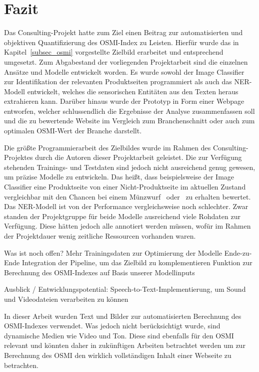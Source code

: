 \section{Fazit}

Das Consulting-Projekt hatte zum Ziel einen Beitrag zur automatisierten und objektiven Quantifizierung des
\ac{OSMI}-Index zu Leisten.
Hierfür wurde das in Kapitel~\ref{subsec_osmi} vorgestellte Zielbild erarbeitet und entsprechend umgesetzt.
Zum Abgabestand der vorliegenden Projektarbeit sind die einzelnen Ansätze und Modelle entwickelt worden.
Es wurde sowohl der Image Classifier zur Identifikation der relevanten Produktseiten programmiert als auch das \ac{NER}-Modell
entwickelt, welches die sensorischen Entitäten aus den Texten heraus extrahieren kann.
Darüber hinaus wurde der Prototyp in Form einer Webpage entworfen, welcher schlussendlich die Ergebnisse der Analyse
zusammenfassen soll und die zu bewertende Website im Vergleich zum Branchenschnitt oder auch zum optimalen \ac{OSMI}-Wert
der Branche darstellt.

Die größte Programmierarbeit des Zielbildes wurde im Rahmen des Consulting-Projektes durch die Autoren dieser Projektarbeit
geleistet.
Die zur Verfügung stehenden Trainings- und Testdaten sind jedoch nicht ausreichend genug gewesen, um präzise Modelle
zu entwickeln.
Das heißt, dass beispielsweise der Image Classifier eine Produktseite von einer Nicht-Produktseite im aktuellen Zustand vergleichbar
mit den Chancen bei einem Münzwurf \grqq~oder \grqq~zu erhalten bewertet.
Das \ac{NER}-Modell ist von der Performance vergleichsweise noch schlechter.
Zwar standen der Projektgruppe für beide Modelle ausreichend viele Rohdaten zur Verfügung.
Diese hätten jedoch alle annotiert werden müssen, wofür im Rahmen der Projektdauer wenig zeitliche
Ressourcen vorhanden waren.


Was ist noch offen?
Mehr Trainingsdaten zur Optimierung der Modelle
Ende-zu-Ende Integration der Pipeline, um das Zielbild zu komplementieren
Funktion zur Berechnung des OSMI-Indexes auf Basis unserer Modellinputs

Ausblick  / Entwicklungspotential:
Speech-to-Text-Implementierung, um Sound und Videodateien verarbeiten zu können

In dieser Arbeit wurden Text und Bilder zur automatisierten Berechnung des \ac{OSMI}-Indexes verwendet. Was jedoch nicht berücksichtigt wurde, sind dynamische Medien wie Video und Ton.
Diese sind ebenfalls für den OSMI relevant und könnten daher in zukünftigen Arbeiten betrachtet werden um zur Berechnung des OSMI den wirklich vollständigen Inhalt einer Webseite zu betrachten.